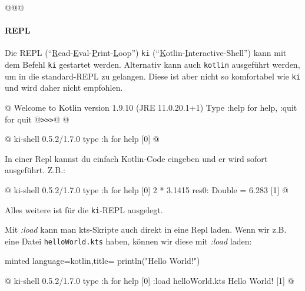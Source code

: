 \begin{commandshell}
    @\shellprefix@kotlin @\textit{}@
\end{commandshell}
\clearpage
\paragraph*{REPL}\mbox{}

Die REPL (\enquote{\underline{R}ead-\underline{E}val-\underline{P}rint-\underline{L}oop}) \texttt{ki} (\enquote{\underline{K}otlin-\underline{I}nteractive-Shell}) kann mit dem Befehl \texttt{ki} gestartet werden. Alternativ kann auch \texttt{kotlin} ausgeführt werden, um in die standard-REPL zu gelangen. Diese ist aber nicht so komfortabel wie \texttt{ki} und wird daher nicht empfohlen.
\begin{commandshell}[][minted language=text]
    @\shellprefix@kotlin
    Welcome to Kotlin version 1.9.10 (JRE 11.0.20.1+1)
    Type :help for help, :quit for quit
    @\texttt{>>>}@ @\shellcursor@
\end{commandshell}

\begin{commandshell}[][minted language=text]
    @\shellprefix@ki
    ki-shell 0.5.2/1.7.0
    type :h for help
    [0] @\shellcursor@
\end{commandshell}

In einer Repl kannst du einfach Kotlin-Code eingeben und er wird sofort ausgeführt. Z.B.:
\begin{commandshell}[][minted language=text]
    @\shellprefix@ki
    ki-shell 0.5.2/1.7.0
    type :h for help
    [0] 2 * 3.1415
    res0: Double = 6.283
    [1] @\shellcursor@
\end{commandshell}

Alles weitere ist für die \texttt{ki}-REPL ausgelegt.

Mit \textit{:load} kann man kts-Skripte auch direkt in eine Repl laden. Wenn wir z.B. eine Datei \texttt{helloWorld.kts} haben, können wir diese mit \textit{:load} laden:
\begin{codeBlock}[]{minted language=kotlin,title=}
    println("Hello World!")
\end{codeBlock}
\begin{commandshell}[][minted language=text]
    @\shellprefix@ki
    ki-shell 0.5.2/1.7.0
    type :h for help
    [0] :load helloWorld.kts
    Hello World!
    [1] @\shellcursor@
\end{commandshell}

